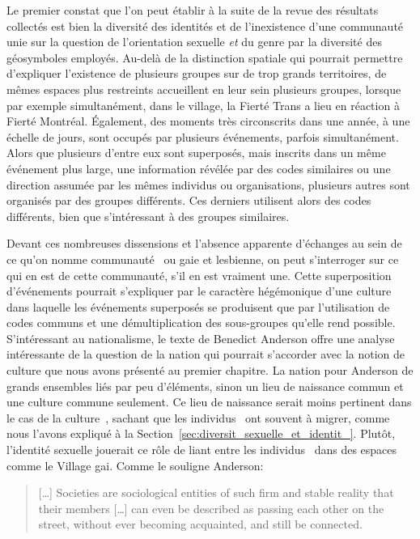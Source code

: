 Le premier constat que l'on peut établir à la suite de la revue des résultats collectés est bien la diversité des identités \lgbt{} et de l'inexistence d'une communauté unie sur la question de l'orientation sexuelle \emph{et} du genre par la diversité des géosymboles employés.
Au-delà de la distinction spatiale qui pourrait permettre d'expliquer l'existence de plusieurs groupes sur de trop grands territoires, de mêmes espaces plus restreints accueillent en leur sein plusieurs groupes, lorsque par exemple simultanément, dans le village, la Fierté Trans a lieu en réaction à Fierté Montréal.
Également, des moments très circonscrits dans une année, à une échelle de jours, sont occupés par plusieurs événements, parfois simultanément.
Alors que plusieurs d'entre eux sont superposés, mais inscrits dans un même événement plus large, une information révélée par des codes similaires ou une direction assumée par les mêmes individus ou organisations, plusieurs autres sont organisés par des groupes différents. 
Ces derniers utilisent alors des codes différents, bien que s'intéressant à des groupes similaires.

Devant ces nombreuses dissensions et l'absence apparente d'échanges au sein de ce qu'on nomme communauté~\lgbt{} ou gaie et lesbienne, on peut s'interroger sur ce qui en est de cette communauté, s'il en est vraiment une.
Cette superposition d'événements pourrait s'expliquer par le caractère hégémonique d'une culture~\lgbt{} dans  laquelle les événements superposés se produisent que par l'utilisation de codes communs et une démultiplication des sous-groupes qu'elle rend possible.
S'intéressant au nationalisme, le texte de Benedict Anderson offre une analyse intéressante de la question de la nation qui pourrait s'accorder avec la notion de culture que nous avons présenté au premier chapitre. 
La nation pour Anderson de grands ensembles liés par peu d'éléments, sinon un lieu de naissance commun et une culture commune seulement.
Ce lieu de naissance serait moins pertinent dans le cas de la culture~\lgbt{}, sachant que les individus~\lgbt{} ont souvent à migrer, comme nous l'avons expliqué à la Section~\ref{sec:diversit_sexuelle_et_identit_}.
Plutôt, l'identité sexuelle jouerait ce rôle de liant entre les individus~\lgbt{} dans des espaces comme le Village gai.
Comme le souligne Anderson:
\begin{quote}
  [\ldots] Societies are sociological entities of such firm and stable reality that their members [\ldots] can even be described as passing each other on the street, without ever becoming acquainted, and still be connected.~\citep[25]{Anderson2006}
\end{quote}

